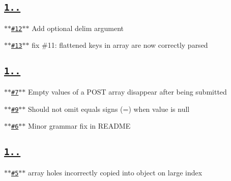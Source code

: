 \subsection*{\href{https://github.com/ljharb/qs/issues?milestone=4&state=closed}{\tt {\bfseries 1..}}}


\begin{DoxyItemize}
\item \href{https://github.com/ljharb/qs/issues/12}{\tt $\ast$$\ast$\#12$\ast$$\ast$} Add optional delim argument
\item \href{https://github.com/ljharb/qs/issues/13}{\tt $\ast$$\ast$\#13$\ast$$\ast$} fix \#11\+: flattened keys in array are now correctly parsed
\end{DoxyItemize}

\subsection*{\href{https://github.com/ljharb/qs/issues?milestone=3&state=closed}{\tt {\bfseries 1..}}}


\begin{DoxyItemize}
\item \href{https://github.com/ljharb/qs/issues/7}{\tt $\ast$$\ast$\#7$\ast$$\ast$} Empty values of a P\+O\+ST array disappear after being submitted
\item \href{https://github.com/ljharb/qs/issues/9}{\tt $\ast$$\ast$\#9$\ast$$\ast$} Should not omit equals signs (=) when value is null
\item \href{https://github.com/ljharb/qs/issues/6}{\tt $\ast$$\ast$\#6$\ast$$\ast$} Minor grammar fix in R\+E\+A\+D\+ME
\end{DoxyItemize}

\subsection*{\href{https://github.com/ljharb/qs/issues?milestone=2&state=closed}{\tt {\bfseries 1..}}}


\begin{DoxyItemize}
\item \href{https://github.com/ljharb/qs/issues/5}{\tt $\ast$$\ast$\#5$\ast$$\ast$} array holes incorrectly copied into object on large index 
\end{DoxyItemize}